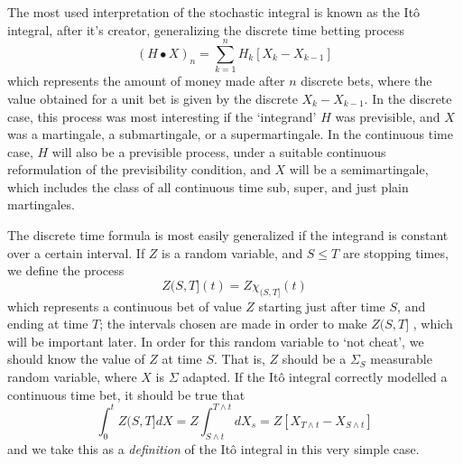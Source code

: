 The most used interpretation of the stochastic integral is known as the It\^{o} integral, after it's creator, generalizing the discrete time betting process
%
\[ (H \bullet X)_n = \sum_{k = 1}^n H_k [X_k - X_{k-1}] \]
%
which represents the amount of money made after $n$ discrete bets, where the value obtained for a unit bet is given by the discrete $X_k - X_{k-1}$. In the discrete case, this process was most interesting if the `integrand' $H$ was previsible, and $X$ was a martingale, a submartingale, or a supermartingale. In the continuous time case, $H$ will also be a previsible process, under a suitable continuous reformulation of the previsibility condition, and $X$ will be a semimartingale, which includes the class of all continuous time sub, super, and just plain martingales.

The discrete time formula is most easily generalized if the integrand is constant over a certain interval. If $Z$ is a random variable, and $S \leq T$ are stopping times, we define the process
%
\[ Z(S,T](t) = Z \chi_{(S,T]}(t) \]
%
which represents a continuous bet of value $Z$ starting just after time $S$, and ending at time $T$; the intervals chosen are made in order to make $Z(S,T]$ \caglad, which will be important later. In order for this random variable to `not cheat', we should know the value of $Z$ at time $S$. That is, $Z$ should be a $\Sigma_S$ measurable random variable, where $X$ is $\Sigma$ adapted. If the It\^{o} integral correctly modelled a continuous time bet, it should be true that
%
\[ \int_0^t Z(S,T] dX = Z \int_{S \wedge t}^{T \wedge t} dX_s = Z [X_{T \wedge t} - X_{S \wedge t}] \]
%
and we take this as a {\it definition} of the It\^{o} integral in this very simple case.

